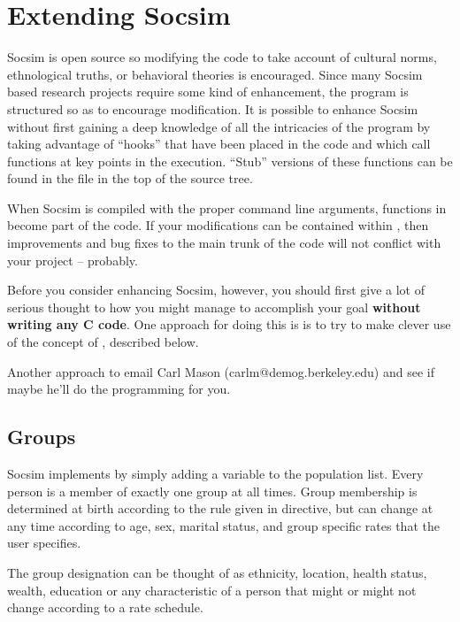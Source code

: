 \section{Extending Socsim}
\label{sec:extending}

Socsim is open source so modifying the code to take account of
cultural norms, ethnological truths, or behavioral theories is
encouraged.  Since many Socsim based research projects require some
kind of enhancement, the program is structured so as to encourage
modification. It is possible to enhance Socsim without first gaining a
deep knowledge of all the intricacies of the program by taking
advantage of ``hooks'' that have been placed in the code and which
call functions at key points in the execution.  ``Stub'' versions of these
functions can be found in the  file in the top
of the source tree.  

When Socsim is compiled with the proper command line arguments,  functions in
 become part of the code.  If your modifications
can be contained within , then improvements and
bug fixes to the main trunk of the code will not conflict with your
project -- probably.

Before you consider enhancing Socsim, however, you should first give a
lot of serious thought to how you might manage to accomplish your goal
\textbf{without writing any C code}.  One approach for doing this is
is to try to make clever use of the concept of , described
below.

Another approach to email Carl Mason (carlm@demog.berkeley.edu) and
see if maybe he'll do the programming for you.
\subsection{Groups}
\label{sec:groups}

 Socsim implements   by simply adding a variable to the
 population list. Every person is a member of exactly one group at all
 times. Group membership is determined at birth according to the rule
 given in   directive, but can change at
 any time according to age, sex, marital status, and group specific
  rates that the user specifies.  

 The group designation can be thought of as ethnicity, location,
 health status, wealth, education or any characteristic of a person
 that might or might not change according to a rate schedule.


